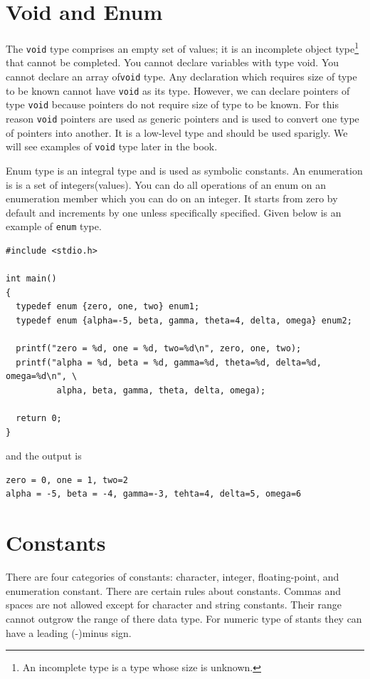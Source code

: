 \section{Void and Enum}
The \texttt{void} type comprises an empty set of values; it is an incomplete
object type\footnote{An incomplete type is a type whose size is unknown.} that
cannot be completed. You cannot declare variables with type void. You cannot
declare an array of\texttt{void} type. Any declaration which requires size of
type to be known cannot have \texttt{void} as its type. However, we can declare
pointers of type \texttt{void} because pointers do not require size of type to
be known. For this reason \texttt{void} pointers are used as generic pointers
and is used to convert one type of pointers into another. It is a low-level
type and should be used sparigly. We will see examples of \texttt{void} type
later in the book.

Enum type is an integral type and is used as symbolic constants. An enumeration
is is a set of integers(values). You can do all operations of an enum on an
enumeration member which you can do on an integer. It starts from zero by
default and increments by one unless specifically specified. Given below is an
example of \texttt{enum} type.

\begin{verbatim}
#include <stdio.h>

int main()
{
  typedef enum {zero, one, two} enum1;
  typedef enum {alpha=-5, beta, gamma, theta=4, delta, omega} enum2;

  printf("zero = %d, one = %d, two=%d\n", zero, one, two);
  printf("alpha = %d, beta = %d, gamma=%d, theta=%d, delta=%d, omega=%d\n", \
          alpha, beta, gamma, theta, delta, omega);

  return 0;
}
\end{verbatim}

and the output is

\begin{verbatim}
zero = 0, one = 1, two=2
alpha = -5, beta = -4, gamma=-3, tehta=4, delta=5, omega=6
\end{verbatim}

\section{Constants}
There are four categories of constants: character, integer, floating-point, and
enumeration constant. There are certain rules about constants. Commas and
spaces are not allowed except for character and string constants. Their range
cannot outgrow the range of there data type. For numeric type of stants they
can have a leading (-)minus sign.

